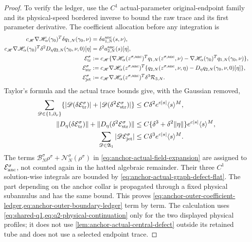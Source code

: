 \begin{proof}
To verify the ledger, use the \(C^1\) actual-parameter original-endpoint
family and its physical-speed bordered inverse to bound the raw trace and
its first parameter derivative.  The coefficient allocation before any
integration is
\begin{align}
 c_{\mathscr H}\nabla\mathscr H_\alpha(\gamma_0)^T
       \delta q_{1,N}(\gamma_0,\nu)
   &=\delta a^{\rm anc}_{1,N}(s,\nu),\notag\\
 c_{\mathscr H}\nabla\mathscr H_\alpha(\gamma_0)^T
       \delta^2D_\eta q_{2,N}(\gamma_0,\nu,0)[\eta]
   &=\delta^2a^{\rm anc}_{2,N}(s)[\eta],            \label{eq:anchor-endpoint-coefficient-table}\\
 \mathcal E_{\rm tr}^\sigma
   &:=c_{\mathscr H}
     \{\nabla\mathscr H_\alpha(z^{\sigma,\rm anc})^T
          q_{1,N}(z^{\sigma,\rm anc},\nu)
       -\nabla\mathscr H_\alpha(\gamma_0)^T
          q_{1,N}(\gamma_0,\nu)\},\notag\\
 \mathcal E_{\rm str}^\sigma
   &:=c_{\mathscr H}\nabla\mathscr H_\alpha
        (z^{\sigma,\rm anc})^T
       \{q_{2,N}(z^{\sigma,\rm anc},\nu,\eta)
          -D_\eta q_{2,N}(\gamma_0,\nu,0)[\eta]\},\notag\\
 \mathcal E_{\rm jet}^\sigma
   &:=c_{\mathscr H}\nabla\mathscr H_\alpha
        (z^{\sigma,\rm anc})^T\delta^3\mathcal R_{3,N}.
\end{align}
Taylor's formula and the actual trace bounds give, with the Gaussian removed,
\begin{align}
 \sum_{\mathscr D\in\{1,\partial_\nu\}}
   \{|\mathscr D(\delta\mathcal E_{\rm tr}^\sigma)|
      +|\mathscr D(\delta^2\mathcal E_{\rm str}^\sigma)|\}
   &\le C\delta^2e^{c|s|}\langle s\rangle^M,\notag\\
 \|D_\eta(\delta\mathcal E_{\rm tr}^\sigma)\|
   +\|D_\eta(\delta^2\mathcal E_{\rm str}^\sigma)\|
   &\le C\{\delta^3+\delta^2\|\eta\|\}
          e^{c|s|}\langle s\rangle^M,\notag\\
 \sum_{\mathscr D\in\mathfrak A_1}
   |\mathscr D\mathcal E_{\rm jet}^\sigma|
   &\le C\delta^3e^{c|s|}\langle s\rangle^M.         \label{eq:anchor-endpoint-coefficient-errors}
\end{align}
The terms
\(\mathcal B_N^\sigma\rho^\sigma+
  \mathcal N_N^\sigma(\rho^\sigma)\) in
\cref{eq:anchor-actual-field-expansion} are assigned to
\(\mathcal E_{\rm anc}^\sigma\), not counted again in the hatted algebraic
remainder.  Their three \(C^1\) solution-wise integrals are bounded by
\cref{eq:anchor-actual-graph-defect-flat}.  The part depending on the anchor
collar is propagated through a fixed physical subannulus and has the same
bound.  This proves
\cref{eq:anchor-outer-coefficient-ledger,eq:anchor-outer-boundary-ledger}
term by term.  The calculation uses
\cref{eq:shared-q1,eq:q2-physical-continuation} only for the two displayed
physical profiles; it does not use
\cref{lem:anchor-actual-central-defect} outside its retained tube and does
not use a selected endpoint trace.


\end{proof}
